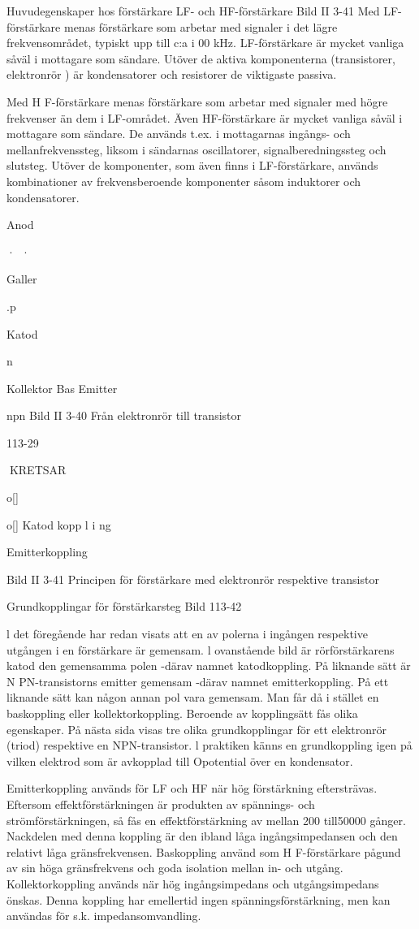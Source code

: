 {{{Huvudegenskaper hos förstärkare
LF- och HF-förstärkare
Bild II 3-41
Med LF-förstärkare menas förstärkare som
arbetar med signaler i det lägre frekvensområdet, typiskt upp till c:a i 00 kHz. LF-förstärkare är mycket vanliga såväl i mottagare
som sändare. Utöver de aktiva komponenterna (transistorer, elektronrör ) är kondensatorer och resistorer de viktigaste passiva.

Med H F-förstärkare menas förstärkare som
arbetar med signaler med högre frekvenser
än dem i LF-området. Även HF-förstärkare
är mycket vanliga såväl i mottagare som
sändare. De används t.ex. i mottagarnas
ingångs- och mellanfrekvenssteg, liksom i
sändarnas oscillatorer, signalberedningssteg
och slutsteg.
Utöver de komponenter, som även finns
i LF-förstärkare, används kombinationer av
frekvensberoende komponenter såsom
induktorer och kondensatorer.

Anod

·~·

Galler

.p

Katod

n

Kollektor
Bas
Emitter

npn
Bild II 3-40 Från elektronrör till transistor

113-29

KRETSAR

o[]

o[]
Katod kopp l i ng

Emitterkoppling

Bild II 3-41 Principen för förstärkare med elektronrör respektive transistor

Grundkopplingar för förstärkarsteg
Bild 113-42

l det föregående har redan visats att en av
polerna i ingången respektive utgången i en
förstärkare är gemensam. l ovanstående
bild är rörförstärkarens katod den gemensamma polen -därav namnet katodkoppling.
På liknande sätt är N PN-transistorns emitter
gemensam -därav namnet emitterkoppling.
På ett liknande sätt kan någon annan pol
vara gemensam. Man får då i stället en
baskoppling eller kollektorkoppling.
Beroende av kopplingsätt fås olika egenskaper. På nästa sida visas tre olika grundkopplingar för ett elektronrör (triod) respektive en NPN-transistor.
l praktiken känns en grundkoppling igen
på vilken elektrod som är avkopplad till Opotential över en kondensator.

Emitterkoppling används för LF och HF
när hög förstärkning eftersträvas. Eftersom
effektförstärkningen är produkten av
spännings- och strömförstärkningen, så fås
en effektförstärkning av mellan 200 till50000
gånger. Nackdelen med denna koppling är
den ibland låga ingångsimpedansen och
den relativt låga gränsfrekvensen.
Baskoppling använd som H F-förstärkare pågund av sin höga gränsfrekvens och
goda isolation mellan in- och utgång.
Kollektorkoppling används när hög ingångsimpedans och utgångsimpedans önskas. Denna koppling har emellertid ingen
spänningsförstärkning, men kan användas
för s.k. impedansomvandling.

}}}
